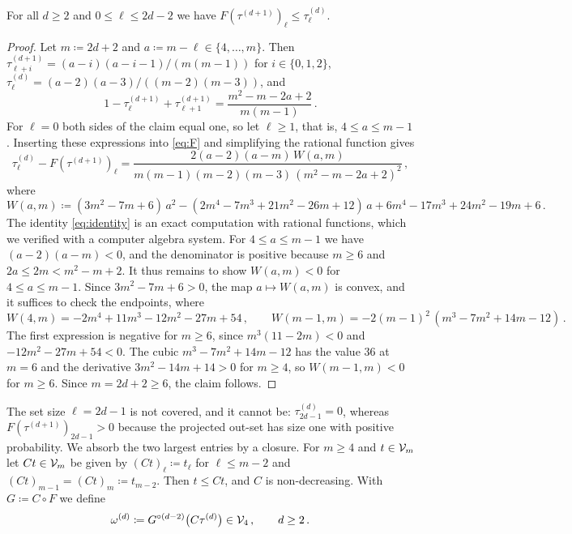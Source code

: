 \documentclass[11pt,letterpaper]{article}
\begin{document}
\begin{lemma}\label{lem:consecutive}
For all $d\ge2$ and $0\le\ell\le2d-2$ we have $F(\tau^{(d+1)})_\ell\le\tau^{(d)}_\ell$.
\end{lemma}

\begin{proof}
Let $m\coloneqq2d+2$ and $a\coloneqq m-\ell\in\{4,\dots,m\}$. Then $\tau^{(d+1)}_{\ell+i}=(a-i)(a-i-1)/(m(m-1))$ for $i\in\{0,1,2\}$, $\tau^{(d)}_\ell=(a-2)(a-3)/((m-2)(m-3))$, and
\begin{equation*}
1-\tau^{(d+1)}_\ell+\tau^{(d+1)}_{\ell+1}=\frac{m^2-m-2a+2}{m(m-1)}\,.
\end{equation*}
For $\ell=0$ both sides of the claim equal one, so let $\ell\ge1$, that is, $4\le a\le m-1$. Inserting these expressions into \cref{eq:F} and simplifying the rational function gives
\begin{equation}\label{eq:identity}
\tau^{(d)}_\ell-F(\tau^{(d+1)})_\ell=\frac{2(a-2)(a-m)\,W(a,m)}{m(m-1)(m-2)(m-3)\,(m^2-m-2a+2)^2}\,,
\end{equation}
where
\begin{equation*}
W(a,m)\coloneqq(3m^2-7m+6)\,a^2-(2m^4-7m^3+21m^2-26m+12)\,a+6m^4-17m^3+24m^2-19m+6\,.
\end{equation*}
The identity \cref{eq:identity} is an exact computation with rational functions, which we verified with a computer algebra system. For $4\le a\le m-1$ we have $(a-2)(a-m)<0$, and the denominator is positive because $m\ge6$ and $2a\le2m<m^2-m+2$. It thus remains to show $W(a,m)<0$ for $4\le a\le m-1$. Since $3m^2-7m+6>0$, the map $a\mapsto W(a,m)$ is convex, and it suffices to check the endpoints, where
\begin{equation*}
W(4,m)=-2m^4+11m^3-12m^2-27m+54\,,\qquad W(m-1,m)=-2(m-1)^2\,(m^3-7m^2+14m-12)\,.
\end{equation*}
The first expression is negative for $m\ge6$, since $m^3(11-2m)<0$ and $-12m^2-27m+54<0$. The cubic $m^3-7m^2+14m-12$ has the value $36$ at $m=6$ and the derivative $3m^2-14m+14>0$ for $m\ge4$, so $W(m-1,m)<0$ for $m\ge6$. Since $m=2d+2\ge6$, the claim follows.
\end{proof}

The set size $\ell=2d-1$ is not covered, and it cannot be: $\tau^{(d)}_{2d-1}=0$, whereas $F(\tau^{(d+1)})_{2d-1}>0$ because the projected out-set has size one with positive probability. We absorb the two largest entries by a closure. For $m\ge4$ and $t\in\mathcal V_m$ let $Ct\in\mathcal V_m$ be given by $(Ct)_\ell\coloneqq t_\ell$ for $\ell\le m-2$ and $(Ct)_{m-1}=(Ct)_m\coloneqq t_{m-2}$. Then $t\le Ct$, and $C$ is non-decreasing. With $G\coloneqq C\circ F$ we define
\begin{equation*}
\omega^{(d)}\coloneqq G^{\circ(d-2)}\big(C\tau^{(d)}\big)\in\mathcal V_4\,,\qquad d\ge2\,.
\end{equation*}
\end{document}
